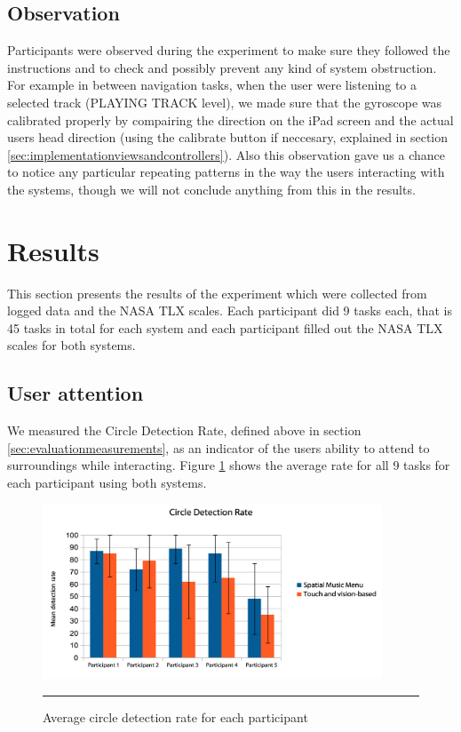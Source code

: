 \subsection{Observation}
Participants were observed during the experiment to make sure they followed the instructions and to check and possibly prevent any kind of system obstruction. For example in between navigation tasks, when the user were listening to a selected track (PLAYING TRACK level), we made sure that the gyroscope was calibrated properly by compairing the direction on the iPad screen and the actual users head direction (using the calibrate button if neccesary, explained in section \ref{sec:implementationviewsandcontrollers}). Also this observation gave us a chance to notice any particular repeating patterns in the way the users interacting with the systems, though we will not conclude anything from this in the results.


\section{Results}
This section presents the results of the experiment which were collected from logged data and the NASA TLX scales. Each participant did 9 tasks each, that is 45 tasks in total for each system and each participant filled out the NASA TLX scales for both systems.

\subsection{User attention}
We measured the Circle Detection Rate, defined above in section \ref{sec:evaluationmeasurements}, as an indicator of the users ability to attend to surroundings while interacting. Figure \ref{fig:resultscircles} shows the average rate for all 9 tasks for each participant using both systems.

\begin{figure}[h]
	\centering
		\includegraphics[width=0.9\textwidth,height=\textheight,keepaspectratio]{./Figures/results_circledetections.png}
		\rule{35em}{1pt}
	\caption[Results Circle Detection Rate]{Average circle detection rate for each participant}
	\label{fig:resultscircles}
\end{figure}

